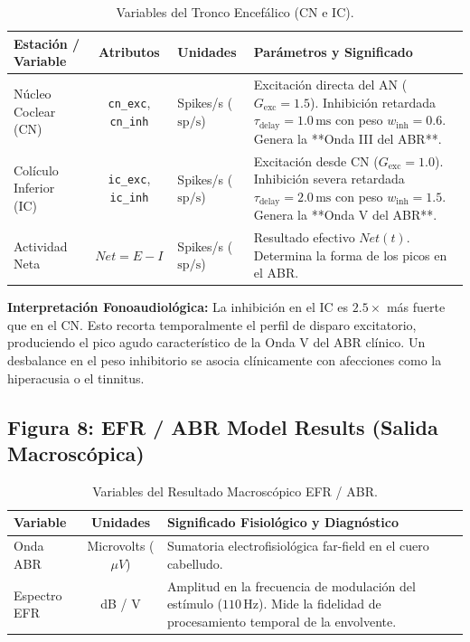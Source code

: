 \documentclass[12pt,a4paper]{article}
\begin{document}
\begin{table}[H]
\centering
\caption{Variables del Tronco Encefálico (CN e IC).}
\begin{tabular}{l c l p{6cm}}
\toprule
\textbf{Estación / Variable} & \textbf{Atributos} & \textbf{Unidades} & \textbf{Parámetros y Significado} \\
\midrule
Núcleo Coclear (CN) & \texttt{cn\_exc}, \texttt{cn\_inh} & Spikes/s ($\text{sp/s}$) & Excitación directa del AN ($G_{\text{exc}} = 1.5$). Inhibición retardada $\tau_{\text{delay}} = 1.0\,\text{ms}$ con peso $w_{\text{inh}} = 0.6$. Genera la **Onda III del ABR**. \\
Colículo Inferior (IC) & \texttt{ic_exc}, \texttt{ic_inh} & Spikes/s ($\text{sp/s}$) & Excitación desde CN ($G_{\text{exc}} = 1.0$). Inhibición severa retardada $\tau_{\text{delay}} = 2.0\,\text{ms}$ con peso $w_{\text{inh}} = 1.5$. Genera la **Onda V del ABR**. \\
Actividad Neta & $Net = E - I$ & Spikes/s ($\text{sp/s}$) & Resultado efectivo $Net(t)$. Determina la forma de los picos en el ABR. \\
\bottomrule
\end{tabular}
\end{table}

\textbf{Interpretación Fonoaudiológica:} La inhibición en el IC es $2.5\times$ más fuerte que en el CN. Esto recorta temporalmente el perfil de disparo excitatorio, produciendo el pico agudo característico de la Onda V del ABR clínico. Un desbalance en el peso inhibitorio se asocia clínicamente con afecciones como la hiperacusia o el tinnitus.

\subsection{Figura 8: EFR / ABR Model Results (Salida Macroscópica)}

\begin{table}[H]
\centering
\caption{Variables del Resultado Macroscópico EFR / ABR.}
\begin{tabular}{l c l p{6cm}}
\toprule
\textbf{Variable} & \textbf{Unidades} & \textbf{Significado Fisiológico y Diagnóstico} \\
\midrule
Onda ABR & Microvolts ($\mu V$) & Sumatoria electrofisiológica far-field en el cuero cabelludo. \\
Espectro EFR & dB / V & Amplitud en la frecuencia de modulación del estímulo ($110\,\text{Hz}$). Mide la fidelidad de procesamiento temporal de la envolvente. \\
\bottomrule
\end{tabular}
\end{table}
\end{document}
